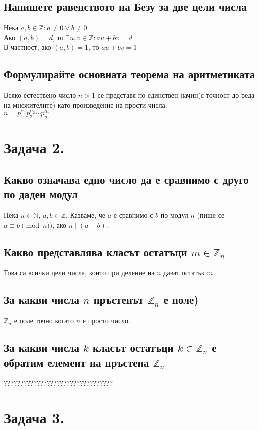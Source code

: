 \documentclass[12pt]{article}
\newcommand*{\Z}{\mathbb{Z}}
\newcommand*{\N}{\mathbb{N}}
\begin{document}
\subsection*{Напишете равенството на Безу за две цели числа}
Нека $a, b \in \Z: a \neq 0 \vee b \neq 0$\\
Ако $(a, b) = d$, то $\exists u, v \in \Z: au + bv = d$\\
В частност, ако $(a, b) = 1$, то $au + bv = 1$

\subsection*{Формулирайте основната теорема на аритметиката}
Всяко естествено число $n > 1$ се представя по единствен начин(с точност до реда на множителите) като произведение на прости числа.\\
$n = p_1^{\alpha_1} p_2^{\alpha_2} \cdots p_n^{\alpha_n}$

\section*{Задача 2.}

\subsection*{Какво означава едно число да е сравнимо с друго по даден модул}
Нека $n \in \N$, $a, b \in \Z$. Казваме, че $a$ е сравнимо с $b$ по модул $n$ (пише се $a \equiv b \pmod{n}$), ако $n \mid (a - b)$.

\subsection*{Какво представлява класът остатъци $\bar{m} \in \Z_n$}
Това са всички цели числа, които при деление на $n$ дават остатък $m$.

\subsection*{За какви числа $n$ пръстенът $\Z_n$ е поле)}
$\Z_n$ е поле точно когато $n$ е просто число.

\subsection*{За какви числа $k$ класът остатъци $k \in \Z_n$ е обратим елемент на пръстена $\Z_n$}
?????????????????????????????????

\section*{Задача 3.}
\end{document}
